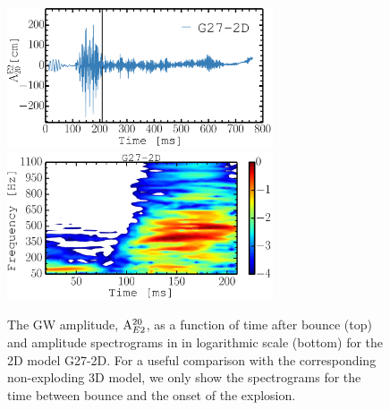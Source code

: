 \begin{figure}
\centering
\includegraphics[width=0.7\textwidth]{./images/paper1/fig8c.pdf} \\
\includegraphics[width=0.7\textwidth]{./images/paper1/fig8d.pdf}
\caption{The GW amplitude, $\mathrm{A}_{\mathrm\mathrm{E2}}^{\mathrm{20}}$, as a function of time after bounce (top)
and amplitude spectrograms in in logarithmic scale (bottom) for the 2D model G27-2D. 
For a useful comparison with the corresponding non-exploding 3D model, we only
show the spectrograms for the time between bounce and the onset of the explosion.
\label{fig:s272dg27}}
\end{figure}


